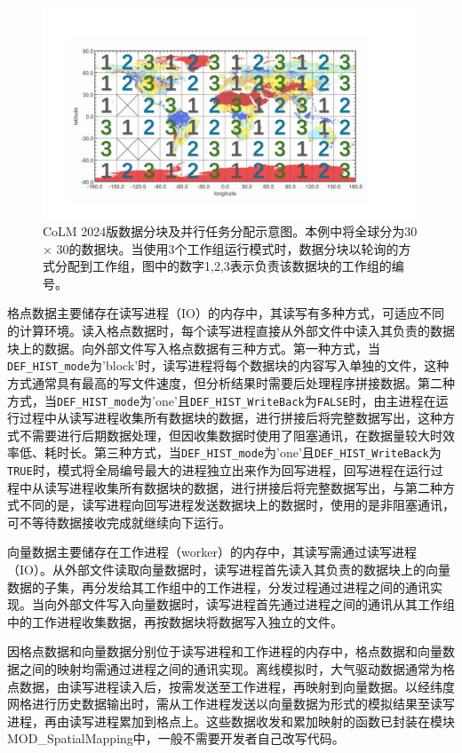 \begin{figure}[htpb]
    \centering
    \includegraphics[width=\textwidth]{figures/数据分块示意图.pdf}
    \caption{CoLM 2024版数据分块及并行任务分配示意图。本例中将全球分为30\textdegree$\times$ 30\textdegree 的数据块。当使用3个工作组运行模式时，数据分块以轮询的方式分配到工作组，图中的数字1,2,3表示负责该数据块的工作组的编号。}
    \label{fig:fig_block}
\end{figure}

格点数据主要储存在读写进程（IO）的内存中，其读写有多种方式，可适应不同的计算环境。读入格点数据时，每个读写进程直接从外部文件中读入其负责的数据块上的数据。向外部文件写入格点数据有三种方式。第一种方式，当\texttt{DEF\_HIST\_mode}为'block'时，读写进程将每个数据块的内容写入单独的文件，这种方式通常具有最高的写文件速度，但分析结果时需要后处理程序拼接数据。第二种方式，当\texttt{DEF\_HIST\_mode}为'one'且\texttt{DEF\_HIST\_WriteBack}为\texttt{FALSE}时，由主进程在运行过程中从读写进程收集所有数据块的数据，进行拼接后将完整数据写出，这种方式不需要进行后期数据处理，但因收集数据时使用了阻塞通讯，在数据量较大时效率低、耗时长。第三种方式，当\texttt{DEF\_HIST\_mode}为'one'且\texttt{DEF\_HIST\_WriteBack}为\texttt{TRUE}时，模式将全局编号最大的进程独立出来作为回写进程，回写进程在运行过程中从读写进程收集所有数据块的数据，进行拼接后将完整数据写出，与第二种方式不同的是，读写进程向回写进程发送数据块上的数据时，使用的是非阻塞通讯，可不等待数据接收完成就继续向下运行。

向量数据主要储存在工作进程（worker）的内存中，其读写需通过读写进程（IO）。从外部文件读取向量数据时，读写进程首先读入其负责的数据块上的向量数据的子集，再分发给其工作组中的工作进程，分发过程通过进程之间的通讯实现。当向外部文件写入向量数据时，读写进程首先通过进程之间的通讯从其工作组中的工作进程收集数据，再按数据块将数据写入独立的文件。

因格点数据和向量数据分别位于读写进程和工作进程的内存中，格点数据和向量数据之间的映射均需通过进程之间的通讯实现。离线模拟时，大气驱动数据通常为格点数据，由读写进程读入后，按需发送至工作进程，再映射到向量数据。以经纬度网格进行历史数据输出时，需从工作进程发送以向量数据为形式的模拟结果至读写进程，再由读写进程累加到格点上。这些数据收发和累加映射的函数已封装在模块MOD\_SpatialMapping中，一般不需要开发者自己改写代码。

